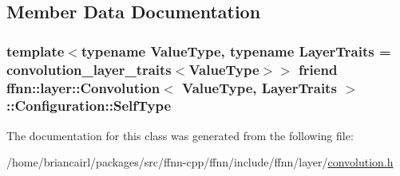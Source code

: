 \subsection{Member Data Documentation}
\hypertarget{classffnn_1_1layer_1_1_convolution_1_1_configuration_aa21d93db4f05a3777606069ec91c0b45}{
\subsubsection[{Self\-Type}]{\setlength{\rightskip}{0pt plus 5cm}template$<$typename Value\-Type, typename Layer\-Traits = convolution\-\_\-layer\-\_\-traits$<$\-Value\-Type$>$$>$ friend {\bf ffnn\-::layer\-::\-Convolution}$<$ Value\-Type, Layer\-Traits $>$\-::Configuration\-::\-Self\-Type}}\label{classffnn_1_1layer_1_1_convolution_1_1_configuration_aa21d93db4f05a3777606069ec91c0b45}


The documentation for this class was generated from the following file\-:\begin{DoxyCompactItemize}
\item 
/home/briancairl/packages/src/ffnn-\/cpp/ffnn/include/ffnn/layer/\hyperlink{convolution_8h}{convolution.\-h}\end{DoxyCompactItemize}
